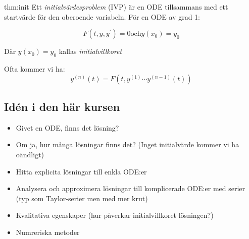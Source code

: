 \begin{theo}[Initialvärdesproblem]{thm:init}
  Ett \textit{initialvärdesproblem} (IVP) är en ODE tillsammans med ett startvärde för den oberoende variabeln. För en ODE av grad 1:
  \par\bigskip

  \begin{equation*}
    F(t,y,y^{\prime})=0 \text{och} y(x_0)=y_0
  \end{equation*}
  \par\bigskip

  Där $y(x_0)=y_0$ kallas \textit{initialvillkoret}
\end{theo}
\par\bigskip

\noindent Ofta kommer vi ha:
\begin{equation*}
  y^{(n)}(t)= F(t,y^{(1)}\cdots y^{(n-1)}(t))
\end{equation*}
\par\bigskip

\subsection{Idén i den här kursen}
\par\bigskip

\begin{itemize}
  \item Givet en ODE, finns det lösning?
  \item Om ja, hur många lösningar finns det? (Inget initialvärde kommer vi ha oändligt)
  \item Hitta explicita lösningar till enkla ODE:er
  \item Analysera och approximera lösningar till komplicerade ODE:er med serier (typ som Taylor-serier men med mer krut)
  \item Kvalitativa egenskaper (hur påverkar initialvillkoret lösningen?)
  \item Numreriska metoder
\end{itemize}









